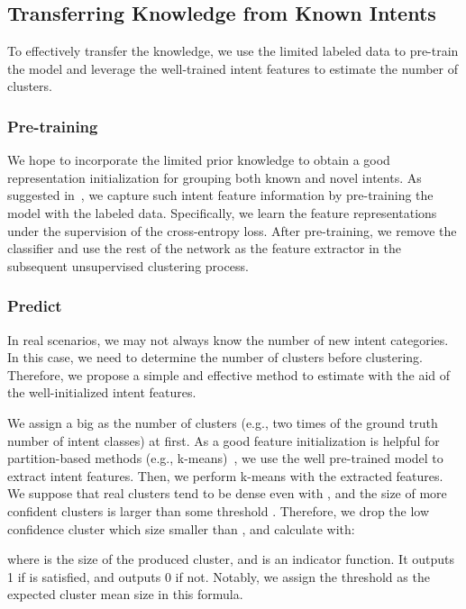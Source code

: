 \documentclass[letterpaper]{article} \usepackage{aaai21}  \usepackage{times}  \usepackage{helvet} \usepackage{courier}  \usepackage[hyphens]{url}  \usepackage{graphicx} \urlstyle{rm} \def\UrlFont{\rm}  \usepackage{natbib}  \usepackage{caption} \frenchspacing  \setlength{\pdfpagewidth}{8.5in}  \setlength{\pdfpageheight}{11in}  \usepackage{amsmath}
\begin{document}
	\subsection{Transferring Knowledge from Known Intents}
	To effectively transfer the knowledge, we use the limited labeled data to pre-train the model and leverage the well-trained intent features to estimate the number of clusters.
	
	\subsubsection{Pre-training} We hope to incorporate the limited prior knowledge to obtain a good representation initialization for grouping both known and novel intents. As suggested in~\cite{Han2019learning}, we capture such intent feature information by pre-training the model with the labeled data. Specifically, we learn the feature representations under the supervision of the cross-entropy loss. After pre-training, we remove the classifier and use the rest of the network as the feature extractor in the subsequent unsupervised clustering process.
	
	\subsubsection{Predict }
	In real scenarios, we may not always know the number of new intent categories. 
	In this case, we need to determine the number of clusters  before clustering. Therefore, we propose a simple and effective method to estimate  with the aid of the well-initialized intent features.
	
	We assign a big  as the number of clusters (e.g., two times of the ground truth number of intent classes) at first. As a good feature initialization is helpful for partition-based methods (e.g., k-means)~\cite{platt1999probabilistic}, we use the well pre-trained model to extract intent features. Then, we perform k-means with the extracted features. We suppose that real clusters tend to be dense even with , and the size of more confident clusters is larger than some threshold . Therefore, we drop the low confidence cluster which size smaller than , and calculate  with:
	
	where  is the size of the  produced cluster, and  is an indicator function. It outputs 1 if  is satisfied, and outputs 0 if not. Notably, we assign the threshold  as the expected cluster mean size  in this formula.
	
\end{document}
